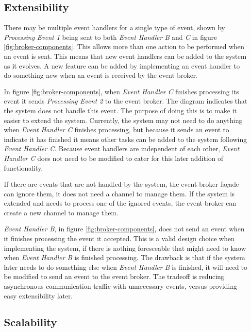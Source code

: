 \subsection{Extensibility}\label{sec:extensibility}

There may be multiple event handlers for a single type of event,
shown by \emph{Processing Event 1} being sent to both \emph{Event Handler B} and \emph{C} in figure \ref{fig:broker-components}.
This allows more than one action to be performed when an event is sent.
This means that new event handlers can be added to the system as it evolves.
A new feature can be added by implementing an event handler to do something new when an event is received by the event broker.

In figure \ref{fig:broker-components}, when \emph{Event Handler C} finishes processing its event it sends \emph{Processing Event 2} to the event broker.
The diagram indicates that the system does not handle this event.
The purpose of doing this is to make it easier to extend the system.
Currently, the system may not need to do anything when \emph{Event Handler C} finishes processing,
but because it sends an event to indicate it has finished it means other tasks can be added to the system following \emph{Event Handler C}.
Because event handlers are independent of each other, \emph{Event Handler C} does not need to be modified to cater for this later addition of functionality.

If there are events that are not handled by the system, the event broker façade can ignore them, it does not need a channel to manage them.
If the system is extended and needs to process one of the ignored events, the event broker can create a new channel to manage them.

\emph{Event Handler B}, in figure \ref{fig:broker-components}, does not send an event when it finishes processing the event it accepted.
This is a valid design choice when implementing the system,
if there is nothing foreseeable that might need to know when \emph{Event Handler B} is finished processing.
The drawback is that if the system later needs to do something else when \emph{Event Handler B} is finished,
it will need to be modified to send an event to the event broker.
The tradeoff is reducing asynchronous communication traffic with unnecessary events, versus providing easy extensibility later.

\subsection{Scalability}

